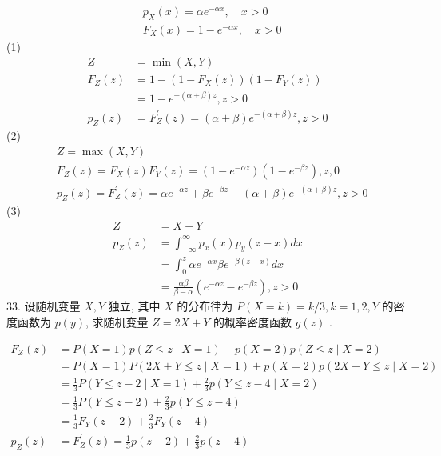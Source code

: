 \documentclass[14pt]{scrartcl} %
\numberwithin{equation}{section} %
\numberwithin{figure}{section} %
\numberwithin{table}{section} %
\begin{document}
\[
\begin{aligned}
	& p_X(x)=\alpha e^{-\alpha x}, \quad x>0 \\
	& F_X(x)=1-e^{-\alpha x}, \quad x>0
\end{aligned}
\]
(1)
\[
\begin{aligned}
	Z&=\min (X, Y) \\
	F_Z(z)&=1 -  \left(1-F_X(z)\right)\left(1-F_Y(z)\right) \\
	& =1-e^{-(\alpha+\beta) z}, z>0 \\
	p_Z(z)&=F_Z^{\prime}(z)=(\alpha+\beta) e^{-(\alpha+\beta) z}, z>0
\end{aligned}
\]
(2)
\[
\begin{aligned}
	& Z=\max (X, Y) \\
	& F_Z(z)=F_X(z) F_Y(z)=\left(1-e^{-\alpha z}\right)\left(1-e^{-\beta z}\right), z, 0 \\
	& p_Z(z)=F_Z^{\prime}(z)=\alpha e^{-\alpha z}+\beta e^{-\beta z}-(\alpha+\beta) e^{-(\alpha + \beta)  z}, z>0
\end{aligned}
\]
(3)
\[
\begin{aligned}
	Z& =X+Y\\
	p_Z(z) & =\int_{-\infty}^{\infty} p_x(x) p_y(z-x) d x \\
	& =\int_0^z \alpha e^{-\alpha x} \beta e^{-\beta(z-x)} d x \\
	& =\frac{\alpha \beta}{\beta-\alpha}\left(e^{-\alpha z}-e^{-\beta z}\right), z>0
\end{aligned}
\]
33. 设随机变量 $X, Y$ 独立, 其中 $X$ 的分布律为 $P(X=k)=k / 3, k=1,2, Y$ 的密度函数为 $p(y)$, 求随机变量 $Z=2 X+Y$ 的概率密度函数 $g(z)$ .

\[
\begin{aligned}
	F_Z(z) & =P(X=1) p(Z\leq z \mid X=1)+p(X=2) p(Z \leq z \mid X=2) \\
	& =P(X=1) P(2 X+Y \leq z \mid X=1)+p(X=2) p(2X+Y \leq z \mid X=2) \\
	& =\frac{1}{3} P(Y \leq z-2 \mid X=1)+\frac{2}{3} p(Y \leq z-4 \mid X=2) \\
	& =\frac{1}{3} P(Y \leq z-2)+\frac{2}{3} p(Y \leq z-4) \\
	& =\frac{1}{3} F_Y(z-2)+\frac{2}{3} F_Y(z-4) \\
	p_Z(z) & =F_Z^{\prime}(z)=\frac{1}{3} p(z-2)+\frac{2}{3} p(z-4)
\end{aligned}
\]
	
	
\end{document}
